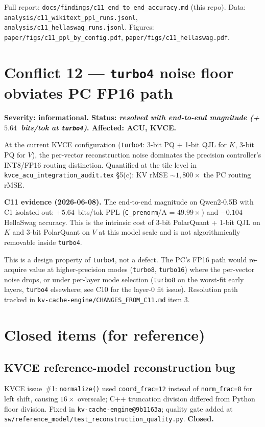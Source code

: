 \documentclass[11pt]{article}
\begin{document}
Full report: \texttt{docs/findings/c11\_end\_to\_end\_accuracy.md}
(this repo). Data: \texttt{analysis/c11\_wikitext\_ppl\_runs.jsonl},
\texttt{analysis/c11\_hellaswag\_runs.jsonl}. Figures:
\texttt{paper/figs/c11\_ppl\_by\_config.pdf},
\texttt{paper/figs/c11\_hellaswag.pdf}.

\section{Conflict 12 --- \texttt{turbo4} noise floor obviates PC FP16 path}
\label{sec:c12}

\textbf{Severity: informational. Status: \textit{resolved with end-to-end
magnitude (+$5.64$~bits/tok at \texttt{turbo4})}. Affected: ACU, KVCE.}

At the current KVCE configuration (\texttt{turbo4}: 3-bit PQ +
1-bit QJL for $K$, 3-bit PQ for $V$), the per-vector reconstruction
noise dominates the precision controller's INT8/FP16 routing
distinction. Quantified at the tile level in
\texttt{kvce\_acu\_integration\_audit.tex} \S5(c): KV rMSE
$\sim 1{,}800\times$ the PC routing rMSE.

\textbf{C11 evidence (2026-06-08).} The end-to-end magnitude on
Qwen2-0.5B with C1 isolated out: $+5.64$~bits/tok PPL
(\texttt{C\_prenorm}/A = $49.99\times$) and $-0.104$ HellaSwag accuracy.
This is the intrinsic cost of 3-bit PolarQuant + 1-bit QJL on $K$ and
3-bit PolarQuant on $V$ at this model scale and is not algorithmically
removable inside \texttt{turbo4}.

This is a design property of \texttt{turbo4}, not a defect. The
PC's FP16 path would re-acquire value at higher-precision modes
(\texttt{turbo8}, \texttt{turbo16}) where the per-vector noise
drops, or under per-layer mode selection (\texttt{turbo8} on the
worst-fit early layers, \texttt{turbo4} elsewhere; see C10 for the
layer-0 fit issue). Resolution path tracked in
\texttt{kv-cache-engine/CHANGES\_FROM\_C11.md} item 3.

\section{Closed items (for reference)}
\label{sec:closed}

\subsection*{KVCE reference-model reconstruction bug}

KVCE issue~\#1: \texttt{normalize()} used \texttt{coord\_frac=12}
instead of \texttt{norm\_frac=8} for left shift, causing $16\times$
overscale; C++ truncation division differed from Python
floor division. Fixed in \texttt{kv-cache-engine@9b1163a}; quality
gate added at \texttt{sw/reference\_model/test\_reconstruction\_quality.py}.
\textbf{Closed.}
\end{document}
